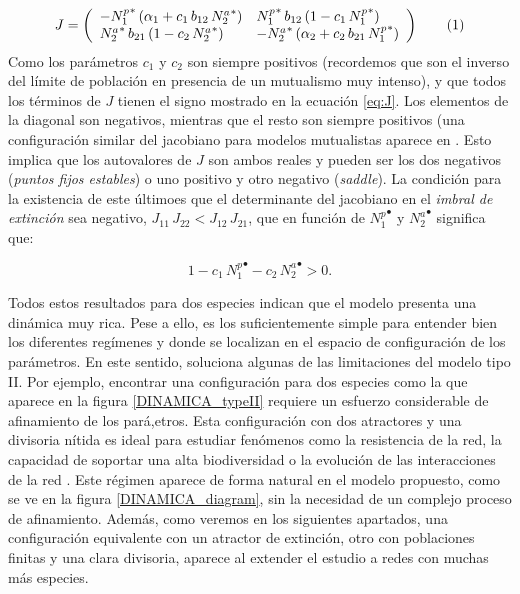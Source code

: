 \begin{equation}
J = \left(
\begin{array}{ll}
- {N^{p}_{1}}^* \, (\alpha_{1}+ c_{1}\, b_{12} \, {N^a_2}^* )  & {N_{1}^{p}}^* \, b_{12} \, (1 - c_{1}\, {N_{1}^{p}}^* ) \\
{N_{2}^{a}}^* \, b_{21}\, (1 - c_{2}\, {N_{2}^{a}}^* ) & - {N_{2}^{a}}^* \, (\alpha_{2}+ c_{2}\,b_{21}\,{N_{1}^{p}}^* )
\end{array}
\right)\stepcounter{equation}\tag{\theequation}\label{eq:J}
\end{equation}
Como los parámetros $c_{1}$ y $c_2$ son siempre positivos (recordemos que son el inverso del límite de población en presencia de un mutualismo muy intenso), y que todos los términos de $J$ tienen el signo mostrado en la ecuación \ref{eq:J}. Los elementos de la diagonal son negativos, mientras que el resto son siempre positivos (una configuración similar del jacobiano para modelos mutualistas aparece en \cite{goh1979}. Esto implica que los autovalores de $J$ son ambos reales y pueden ser los dos negativos (\textit{puntos fijos estables}) o uno positivo y otro negativo (\textit{saddle}). La condición para la existencia de este últimoes que el determinante del jacobiano en el \textit{imbral de extinción} sea negativo, $J_{11} \, J_{22} < J_{12}\, J_{21}$, que en función de ${N_{1}^{p}}^\bullet$ y ${N_{2}^{a}}^\bullet$ significa que:

\begin{equation}
1-c_{1}\, {N_{1}^{p}}^\bullet - c_{2}\, {N_{2}^{a}}^\bullet > 0 .
\end{equation}

Todos estos resultados para dos especies indican que el modelo presenta una dinámica muy rica. Pese a ello, es los suficientemente simple para entender bien los diferentes regímenes y donde se localizan en el espacio de configuración de los parámetros. En este sentido, soluciona algunas de las limitaciones del modelo tipo II. Por ejemplo, encontrar una configuración para dos especies como la que aparece en la figura \ref{DINAMICA_typeII} requiere un esfuerzo considerable de afinamiento de los pará,etros. Esta configuración con dos atractores y una divisoria nítida es ideal para estudiar fenómenos como la resistencia de la red, la capacidad de soportar una alta biodiversidad o la evolución de las interacciones de la red \cite{bastolla2009, suweis2013emergence}. Este régimen aparece de forma natural en el modelo propuesto, como se ve en la figura \ref{DINAMICA_diagram}, sin la necesidad de un complejo proceso de afinamiento. Además, como veremos en los siguientes apartados, una configuración equivalente con un atractor de extinción, otro con poblaciones finitas y una clara divisoria, aparece al extender el estudio a redes con muchas más
especies.

